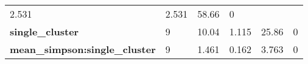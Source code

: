 \documentclass[]{article}
\begin{document}
\begin{longtable}[c]{@{}llllll@{}}
\begin{minipage}[t]{0.10\columnwidth}
2.531
\strut\end{minipage} &
\begin{minipage}[t]{0.11\columnwidth}\raggedright\strut
2.531
\strut\end{minipage} &
\begin{minipage}[t]{0.11\columnwidth}\raggedright\strut
58.66
\strut\end{minipage} &
\begin{minipage}[t]{0.11\columnwidth}\raggedright\strut
0
\strut\end{minipage}\tabularnewline
\begin{minipage}[t]{0.36\columnwidth}\raggedright\strut
\textbf{single\_cluster}
\strut\end{minipage} &
\begin{minipage}[t]{0.05\columnwidth}\raggedright\strut
9
\strut\end{minipage} &
\begin{minipage}[t]{0.10\columnwidth}\raggedright\strut
10.04
\strut\end{minipage} &
\begin{minipage}[t]{0.11\columnwidth}\raggedright\strut
1.115
\strut\end{minipage} &
\begin{minipage}[t]{0.11\columnwidth}\raggedright\strut
25.86
\strut\end{minipage} &
\begin{minipage}[t]{0.11\columnwidth}\raggedright\strut
0
\strut\end{minipage}\tabularnewline
\begin{minipage}[t]{0.36\columnwidth}\raggedright\strut
\textbf{mean\_simpson:single\_cluster}
\strut\end{minipage} &
\begin{minipage}[t]{0.05\columnwidth}\raggedright\strut
9
\strut\end{minipage} &
\begin{minipage}[t]{0.10\columnwidth}\raggedright\strut
1.461
\strut\end{minipage} &
\begin{minipage}[t]{0.11\columnwidth}\raggedright\strut
0.162
\strut\end{minipage} &
\begin{minipage}[t]{0.11\columnwidth}\raggedright\strut
3.763
\strut\end{minipage} &
\begin{minipage}[t]{0.11\columnwidth}\raggedright\strut
0
\strut\end{minipage}\tabularnewline

\end{longtable}
\end{document}
